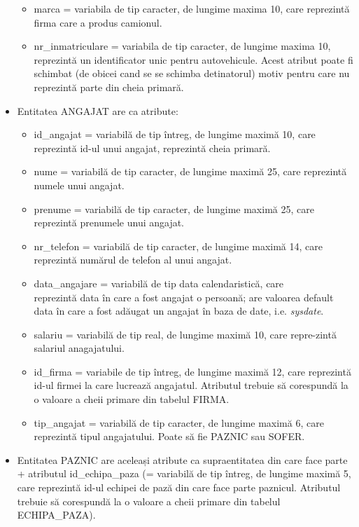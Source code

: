 \documentclass[12pt, a4paper]{article}
\begin{document}
\begin{itemize}
\begin{itemize}
            \item marca = variabila de tip caracter, de lungime maxima 10, care reprezintă firma care a produs camionul.
            \item nr\_inmatriculare = variabila de tip caracter, de lungime maxima 10, reprezintă un identificator unic pentru autovehicule. Acest atribut poate fi schimbat (de obicei cand se se schimba detinatorul) motiv pentru care nu reprezintă parte din cheia primară.
        \end{itemize}
    \item Entitatea ANGAJAT are ca atribute:
        \begin{itemize}
            \item id\_angajat = variabilă de tip întreg, de lungime maximă 10, care reprezintă id-ul unui angajat, reprezintă cheia primară.
            \item nume = variabilă de tip caracter, de lungime maximă 25, care reprezintă numele unui angajat.
            \item prenume = variabilă de tip caracter, de lungime maximă 25, care reprezintă prenumele unui angajat.
            \item nr\_telefon = variabilă de tip caracter, de lungime maximă 14, care reprezintă numărul de telefon al unui angajat.
            \item data\_angajare = variabilă de tip data calendaristică, care \\reprezintă data în care a fost angajat o persoană; are valoarea default data în care a fost adăugat un angajat în baza de date, i.e. \emph{sysdate}.
            \item salariu = variabilă de tip real, de lungime maximă 10, care repre-zintă salariul anagajatului.
            \item id\_firma = variabile de tip întreg, de lungime maximă 12, care reprezintă id-ul firmei la care lucrează angajatul. Atributul trebuie să corespundă la o valoare a cheii primare din tabelul FIRMA.
            \item tip\_angajat = variabilă de tip caracter, de lungime maximă 6, care reprezintă tipul angajatului. Poate să fie PAZNIC sau SOFER.
        \end{itemize}
    \item Entitatea PAZNIC are aceleași atribute ca supraentitatea din care face parte + atributul id\_echipa\_paza (= variabilă de tip întreg, de lungime maximă 5, care reprezintă id-ul echipei de pază din care face parte paznicul. Atributul trebuie să corespundă la o valoare a cheii primare din tabelul ECHIPA\_PAZA).

\end{itemize}
\end{document}
